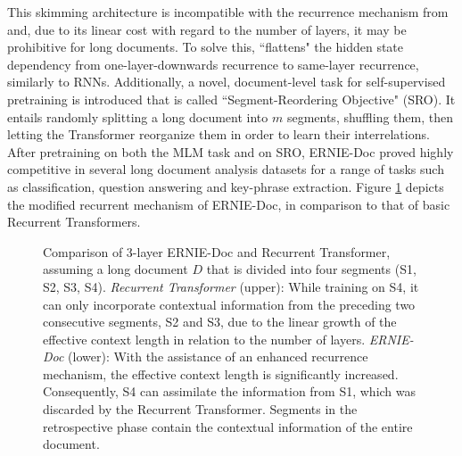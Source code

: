 \documentclass[preprint,review,10pt]{elsarticle}
\begin{document}
	This skimming architecture is incompatible with the recurrence mechanism from \cite{dai-etal-2019-transformer} and, due to its linear cost with regard to the number of layers, it may be prohibitive for long documents. To solve this, \cite{ernie-doc} ``flattens" the hidden state dependency from one-layer-downwards recurrence to same-layer recurrence, similarly to RNNs. Additionally, a novel, document-level task for self-supervised pretraining is introduced that is called ``Segment-Reordering Objective" (SRO). It entails randomly splitting a long document into $m$ segments, shuffling them, then letting the Transformer reorganize them in order to learn their interrelations. After pretraining on both the MLM task and on SRO, ERNIE-Doc proved highly competitive in several long document analysis datasets for a range of tasks such as classification, question answering and key-phrase extraction. Figure \ref{fig::ERNIEDoc} depicts the modified recurrent mechanism of ERNIE-Doc, in comparison to that of basic Recurrent Transformers.
	
	\begin{figure}
		\centering
		
		\caption{Comparison of 3-layer ERNIE-Doc and Recurrent Transformer, assuming a long document $D$ that is divided into four segments (S1, S2, S3, S4). \textit{Recurrent Transformer} (upper): While training on S4, it can only incorporate contextual information from the preceding two consecutive segments, S2 and S3, due to the linear growth of the effective context length in relation to the number of layers. \textit{ERNIE-Doc} (lower): With the assistance of an enhanced recurrence mechanism, the effective context length is significantly increased. Consequently, S4 can assimilate the information from S1, which was discarded by the Recurrent Transformer. Segments in the retrospective phase contain the contextual information of the entire document.}
		\label{fig::ERNIEDoc}
	\end{figure}
	
\end{document}
